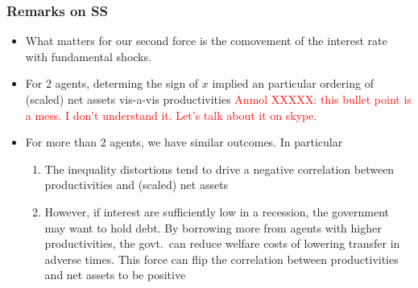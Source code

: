 \documentclass{beamer}
\begin{document}
\begin{frame}
 \frametitle{Remarks on SS}
 \begin{itemize}
 \item  What matters for our second force is the comovement of the interest rate with fundamental shocks.
\item For 2 agents, determing the sign of $x$ implied an particular ordering of (scaled) net assets vis-a-vis productivities
\textcolor{red}{Anmol XXXXX: this bullet point is a mess.  I don't understand it. Let's talk about it on skype.}
 \item For more than 2 agents, we have similar outcomes. In particular
  \begin{enumerate}
   \item The inequality distortions tend to drive a negative correlation between productivities and (scaled) net assets
   \item However, if interest are sufficiently low in a recession, the government may want to hold debt. By borrowing more from agents with higher productivities, the govt.\ can reduce welfare costs of lowering transfer in adverse times.
   This force can flip the correlation between productivities and net assets to be positive
  \end{enumerate}
\end{itemize}


\end{frame}

%
%
%
%
\end{document}
